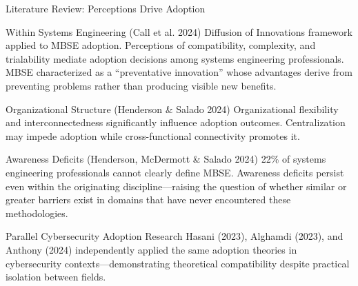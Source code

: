 \documentclass{beamer}
\begin{document}
\begin{frame}[allowframebreaks]{Literature Review: Perceptions Drive Adoption}
  \begin{block}{Within Systems Engineering (Call et al. 2024)}
    Diffusion of Innovations framework applied to MBSE adoption. Perceptions of compatibility, complexity, and trialability mediate adoption decisions among systems engineering professionals. MBSE characterized as a ``preventative innovation'' whose advantages derive from preventing problems rather than producing visible new benefits.
  \end{block}

  \begin{block}{Organizational Structure (Henderson \& Salado 2024)}
    Organizational flexibility and interconnectedness significantly influence adoption outcomes. Centralization may impede adoption while cross-functional connectivity promotes it.
  \end{block}

  \begin{block}{Awareness Deficits (Henderson, McDermott \& Salado 2024)}
    22\% of systems engineering professionals cannot clearly define MBSE. Awareness deficits persist even within the originating discipline---raising the question of whether similar or greater barriers exist in domains that have never encountered these methodologies.
  \end{block}

  \begin{block}{Parallel Cybersecurity Adoption Research}
    Hasani (2023), Alghamdi (2023), and Anthony (2024) independently applied the same adoption theories in cybersecurity contexts---demonstrating theoretical compatibility despite practical isolation between fields.
  \end{block}
\end{frame}
\end{document}
